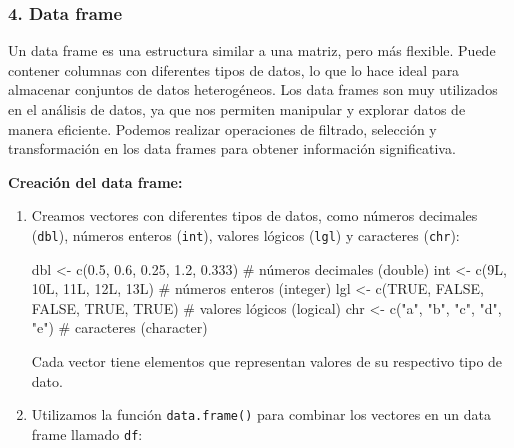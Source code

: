 \documentclass[
  jou,
  floatsintext,
  longtable,
  a4paper,
  nolmodern,
  notxfonts,
  notimes,
  colorlinks=true,linkcolor=blue,citecolor=blue,urlcolor=blue]{apa7}
\newenvironment{Shaded}{\begin{snugshade}}{\end{snugshade}}
\newcommand{\CommentTok}[1]{\textcolor[rgb]{0.37,0.37,0.37}{#1}}
\newcommand{\ConstantTok}[1]{\textcolor[rgb]{0.56,0.35,0.01}{#1}}
\newcommand{\DecValTok}[1]{\textcolor[rgb]{0.68,0.00,0.00}{#1}}
\newcommand{\FloatTok}[1]{\textcolor[rgb]{0.68,0.00,0.00}{#1}}
\newcommand{\FunctionTok}[1]{\textcolor[rgb]{0.28,0.35,0.67}{#1}}
\newcommand{\NormalTok}[1]{\textcolor[rgb]{0.00,0.23,0.31}{#1}}
\newcommand{\OtherTok}[1]{\textcolor[rgb]{0.00,0.23,0.31}{#1}}
\newcommand{\StringTok}[1]{\textcolor[rgb]{0.13,0.47,0.30}{#1}}
\begin{document}
\subsubsection{4. Data frame}\label{data-frame}

Un data frame es una estructura similar a una matriz, pero más flexible.
Puede contener columnas con diferentes tipos de datos, lo que lo hace
ideal para almacenar conjuntos de datos heterogéneos. Los data frames
son muy utilizados en el análisis de datos, ya que nos permiten
manipular y explorar datos de manera eficiente. Podemos realizar
operaciones de filtrado, selección y transformación en los data frames
para obtener información significativa.

\textbf{Creación del data frame:}

\begin{enumerate}
\def\labelenumi{\arabic{enumi}.}
\item
  Creamos vectores con diferentes tipos de datos, como números decimales
  (\texttt{dbl}), números enteros (\texttt{int}), valores lógicos
  (\texttt{lgl}) y caracteres (\texttt{chr}):

\begin{Shaded}
\begin{Highlighting}[]
\NormalTok{dbl }\OtherTok{\textless{}{-}} \FunctionTok{c}\NormalTok{(}\FloatTok{0.5}\NormalTok{, }\FloatTok{0.6}\NormalTok{, }\FloatTok{0.25}\NormalTok{, }\FloatTok{1.2}\NormalTok{, }\FloatTok{0.333}\NormalTok{) }\CommentTok{\# números decimales (double)}
\NormalTok{int }\OtherTok{\textless{}{-}} \FunctionTok{c}\NormalTok{(}\DecValTok{9}\NormalTok{L, }\DecValTok{10}\NormalTok{L, }\DecValTok{11}\NormalTok{L, }\DecValTok{12}\NormalTok{L, }\DecValTok{13}\NormalTok{L) }\CommentTok{\# números enteros (integer)}
\NormalTok{lgl }\OtherTok{\textless{}{-}} \FunctionTok{c}\NormalTok{(}\ConstantTok{TRUE}\NormalTok{, }\ConstantTok{FALSE}\NormalTok{, }\ConstantTok{FALSE}\NormalTok{, }\ConstantTok{TRUE}\NormalTok{, }\ConstantTok{TRUE}\NormalTok{) }\CommentTok{\# valores lógicos (logical)}
\NormalTok{chr }\OtherTok{\textless{}{-}} \FunctionTok{c}\NormalTok{(}\StringTok{"a"}\NormalTok{, }\StringTok{"b"}\NormalTok{, }\StringTok{"c"}\NormalTok{, }\StringTok{"d"}\NormalTok{, }\StringTok{"e"}\NormalTok{) }\CommentTok{\# caracteres (character)}
\end{Highlighting}
\end{Shaded}

  Cada vector tiene elementos que representan valores de su respectivo
  tipo de dato.
\item
  Utilizamos la función \texttt{data.frame()} para combinar los vectores
  en un data frame llamado \texttt{df}:


\end{enumerate}
\end{document}
